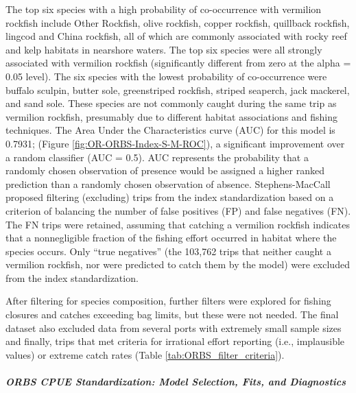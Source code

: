 \documentclass[11pt,
  english,
  a4paper,
]{article}
\begin{document}
The top six species with a high probability of co-occurrence with vermilion rockfish include Other Rockfish, olive rockfish, copper rockfish, quillback rockfish, lingcod and China rockfish, all of which are commonly associated with rocky reef and kelp habitats in nearshore waters. The top six species were all strongly associated with vermilion rockfish (significantly different from zero at the alpha = 0.05 level). The six species with the lowest probability of co-occurrence were buffalo sculpin, butter sole, greenstriped rockfish, striped seaperch, jack mackerel, and sand sole. These species are not commonly caught during the same trip as vermilion rockfish, presumably due to different habitat associations and fishing techniques. The Area Under the Characteristics curve (AUC) for this model is 0.7931; (Figure \ref{fig:OR-ORBS-Index-S-M-ROC}), a significant improvement over a random classifier (AUC = 0.5). AUC represents the probability that a randomly chosen observation of presence would be assigned a higher ranked prediction than a randomly chosen observation of absence. Stephens-MacCall proposed filtering (excluding) trips from the index standardization based on a criterion of balancing the number of false positives (FP) and false negatives (FN). The FN trips were retained, assuming that catching a vermilion rockfish indicates that a nonnegligible fraction of the fishing effort occurred in habitat where the species occurs. Only ``true negatives'' (the 103,762 trips that neither caught a vermilion rockfish, nor were predicted to catch them by the model) were excluded from the index standardization.

\leavevmode\tagmcend\tagstructend\par


After filtering for species composition, further filters were explored for fishing closures and catches exceeding bag limits, but these were not needed. The final dataset also excluded data from several ports with extremely small sample sizes and finally, trips that met criteria for irrational effort reporting (i.e., implausible values) or extreme catch rates (Table \ref{tab:ORBS_filter_criteria}).

\leavevmode\tagmcend\tagstructend\par


\hypertarget{orbs-cpue-standardization-model-selection-fits-and-diagnostics}{%
\subparagraph{ORBS CPUE Standardization: Model Selection, Fits, and Diagnostics}\label{orbs-cpue-standardization-model-selection-fits-and-diagnostics}}
\end{document}
